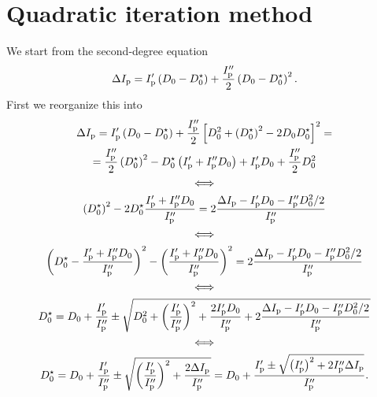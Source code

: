\documentclass{notes}
\begin{document}
	\appendix

	\section{Quadratic iteration method}
	We start from the second-degree equation
	\begin{equation}
		\Delta I_{\rm p} = I_{\rm p}'\left(D_0-D_0^\star\right) +
			\frac{I_{\rm p}''}{2}\left(D_0-D_0^\star\right)^2.
	\end{equation}
	First we reorganize this into
	\begin{equation}
		\begin{gathered}
			\Delta I_{\rm p} =
			I_{\rm p}'\left(D_0-D_0^\star\right) +
			\frac{I_{\rm p}''}{2}\left[
				D_0^2+\left(D_0^\star\right)^2 - 2D_0D_0^\star
			\right]^2
			=\\
			= \frac{I_{\rm p}''}{2}\left(D_0^\star\right)^2 -
			D_0^\star\left( I_{\rm p}' + I_{\rm p}''D_0 \right) +
			I_{\rm p}'D_0 + \frac{I_{\rm p}''}{2}D_0^2\\
			\Longleftrightarrow\\
			\left(D_0^\star\right)^2 - 2D_0^\star\frac{I_{\rm p}'+I_{\rm p}''D_0}{I_{\rm p}''} =
			2\frac{\Delta I_{\rm p} - I_{\rm p}'D_0 - I_{\rm p}''D_0^2/2}{I_{\rm p}''}\\
			\Longleftrightarrow\\
			\left(D_0^\star-\frac{I_{\rm p}'+I_{\rm p}''D_0}{I_{\rm p}''}\right)^2
			- \left(\frac{I_{\rm p}'+I_{\rm p}''D_0}{I_{\rm p}''}\right)^2 =
			2\frac{\Delta I_{\rm p} - I_{\rm p}'D_0 - I_{\rm p}''D_0^2/2}
			{I_{\rm p}''}\\
			\Longleftrightarrow\\
			D_0^\star = D_0 + \frac{I_{\rm p}'}{I_{\rm p}''}\pm
				\sqrt{
					D_0^2 +
					\left(\frac{I_{\rm p}'}{I_{\rm p}''}\right)^2 +
					\frac{2I_{\rm p}'D_0}{I_{\rm p}''} +
					2\frac{\Delta I_{\rm p} - I_{\rm p}'D_0 - I_{\rm p}''D_0^2/2}
					{I_{\rm p}''}
				}\\
			\Longleftrightarrow\\
			D_0^\star =
				D_0 + \frac{I_{\rm p}'}{I_{\rm p}''} \pm
				\sqrt{
					\left(\frac{I_{\rm p}'}{I_{\rm p}''}\right)^2 +
					\frac{2\Delta I_{\rm p}}{I_{\rm p}''}
				}
				=
				D_0 + \frac{I_{\rm p}'\pm\sqrt{
					\left(I_{\rm p}'\right)^2+2I_{\rm p}''\Delta I_{\rm p}
				}}{I_{\rm p}''}.
		\end{gathered}
	\end{equation}
\end{document}

